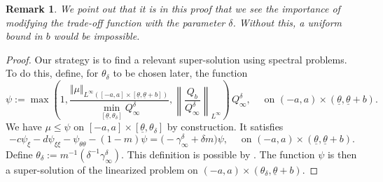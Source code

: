 \documentclass[11pt]{article}    %
\newtheorem{remark}[theorem]{Remark}
\begin{document}
\begin{remark}
We point out that it is in this proof that we see the importance of modifying the trade-off function with the parameter $\delta$.  Without this, a uniform bound in $b$ would be impossible.
\end{remark}

\begin{proof}%
Our strategy is to find a relevant super-solution using spectral problems.
To do this, define, for $\theta_\delta$ to be chosen later, the function 
\begin{equation*}
	\psi  := \max \left( 1 , \frac{\Vert \mu \Vert_{L^{\infty} ( [-a,a] \times [\underline\theta, \underline\theta + b] )}}{\min_{[\underline\theta,\theta_\delta]} Q_\infty^\delta}, \left\|\frac{Q_b}{Q_\infty^\delta}\right\|_{L^\infty} \right) \, Q_\infty^\delta,
	\quad\text{ on }  (-a,a) \times (\underline\theta, \underline\theta + b).
\end{equation*}
 We have $\mu \leq \psi$ on $[-a,a] \times [\underline\theta,\theta_\delta]$ by construction. It satisfies
\begin{equation*}
- c \psi_{\xi}  - d \psi_{\xi\xi} - \psi_{\theta\theta} - \left( 1 - m \right)\psi  = \big( - \gamma_\infty^\delta + \delta m \big) \psi, \quad \text{ on } (-a,a) \times (\underline\theta, \underline\theta + b).
\end{equation*}
Define $\theta_\delta := m^{-1}\left(\delta^{-1}  \gamma_\infty^\delta \right)$. This definition is possible by . %
The function $\psi$ is then a super-solution of the linearized problem on $(-a,a) \times (\theta_\delta,\underline\theta+b)$. 

\end{proof}
\end{document}
